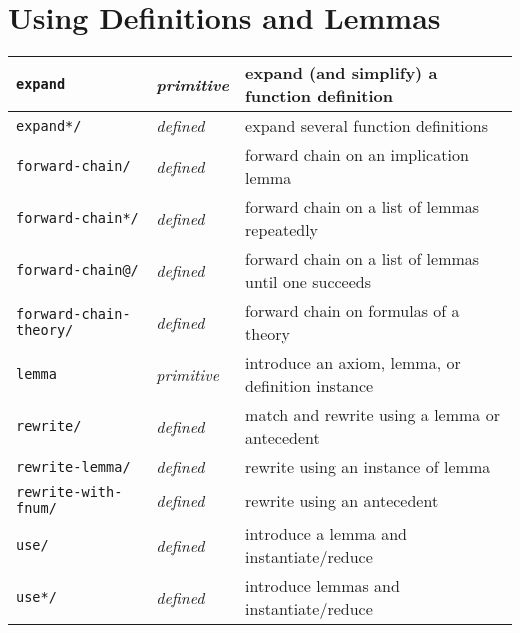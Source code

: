 \documentclass[12pt,twoside]{book}
\makeatletter
\newcommand{\indtt}[1]{\texttt{#1}\index{#1@{\texttt{#1}}}}  %
\newcommand{\indttdol}[1]{\texttt{#1/\char36}\index{#1@{\texttt{#1}}}} %
\makeatother
\begin{document}
\section{Using Definitions and Lemmas}

\begin{tabularx}{\textwidth}{|l|l|X|}\hline
\indtt{expand} & \emph{primitive}
  & expand (and simplify) a function definition\\\hline
\indttdol{expand*} & \emph{defined}
  & expand several function definitions\\\hline
\indttdol{forward-chain} & \emph{defined}
  & forward chain on an implication lemma\\\hline
\indttdol{forward-chain*} & \emph{defined}
  & forward chain on a list of lemmas repeatedly\\\hline
\indttdol{forward-chain@} & \emph{defined}
  & forward chain on a list of lemmas until one succeeds \\\hline
\indttdol{forward-chain-theory} & \emph{defined}
  & forward chain on formulas of a theory\\\hline
\indtt{lemma} & \emph{primitive}
  & introduce an axiom, lemma, or definition instance\\\hline
\indttdol{rewrite} & \emph{defined}
  & match and rewrite using a lemma or antecedent \\\hline
\indttdol{rewrite-lemma} & \emph{defined}
  & rewrite using an instance of lemma \\\hline
\indttdol{rewrite-with-fnum} & \emph{defined}
  & rewrite using an antecedent \\\hline
\indttdol{use} & \emph{defined}
  & introduce a lemma and instantiate/reduce \\\hline
\indttdol{use*} & \emph{defined}
  & introduce lemmas and instantiate/reduce \\\hline
\end{tabularx}
\end{document}

